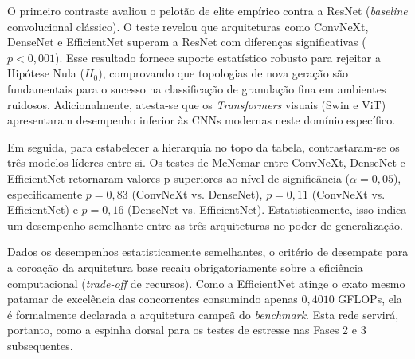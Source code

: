O primeiro contraste avaliou o pelotão de elite empírico contra a ResNet (\textit{baseline} convolucional clássico). O teste revelou que arquiteturas como ConvNeXt, DenseNet e EfficientNet superam a ResNet com diferenças significativas ($p < 0,001$). Esse resultado fornece suporte estatístico robusto para rejeitar a Hipótese Nula ($H_{0}$), comprovando que topologias de nova geração são fundamentais para o sucesso na classificação de granulação fina em ambientes ruidosos. Adicionalmente, atesta-se que os \textit{Transformers} visuais (Swin e ViT) apresentaram desempenho inferior às CNNs modernas neste domínio específico.

Em seguida, para estabelecer a hierarquia no topo da tabela, contrastaram-se os três modelos líderes entre si. Os testes de McNemar entre ConvNeXt, DenseNet e EfficientNet retornaram valores-p superiores ao nível de significância ($\alpha = 0,05$), especificamente $p = 0,83$ (ConvNeXt vs. DenseNet), $p = 0,11$ (ConvNeXt vs. EfficientNet) e $p = 0,16$ (DenseNet vs. EfficientNet). Estatisticamente, isso indica um desempenho semelhante entre as três arquiteturas no poder de generalização.

Dados os desempenhos estatisticamente semelhantes, o critério de desempate para a coroação da arquitetura base recaiu obrigatoriamente sobre a eficiência computacional (\textit{trade-off} de recursos). Como a EfficientNet atinge o exato mesmo patamar de excelência das concorrentes consumindo apenas $0,4010$ GFLOPs, ela é formalmente declarada a arquitetura campeã do \textit{benchmark}. Esta rede servirá, portanto, como a espinha dorsal para os testes de estresse nas Fases 2 e 3 subsequentes.

